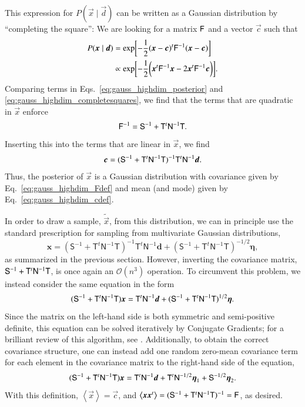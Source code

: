 \documentclass[twocolumn]{aa}
\renewcommand{\d}[0]{\vec{d}}
\newcommand{\x}[0]{\vec{x}}
\newcommand{\F}[0]{\tens{F}}
\newcommand{\T}[0]{\tens{T}}
\newcommand{\N}[0]{\tens{N}}
\renewcommand{\S}[0]{\tens{S}}
\begin{document}
This expression for $P(\x\mid \d)$ can be written as a Gaussian
distribution by ``completing the square'': We are looking for a matrix
$\F$ and a vector $\vec{c}$ such that
\begin{align}
    P(\x\mid \d) &= \exp\biggl[-\frac{1}{2}(\x - \vec{c})^t\F^{-1}(\x - \vec{c})\biggr] \nonumber \\
             &\propto \exp\biggl[-\frac{1}{2}\biggl(\x^t\F^{-1}\x - 2\x^t\F^{-1}\vec{c}\biggr)\biggr].
    \label{eq:gauss_highdim_completesquares}
\end{align}
Comparing terms in Eqs.~\eqref{eq:gauss_highdim_posterior} and \eqref{eq:gauss_highdim_completesquares}, we find that the terms that are quadratic in $\x$ enforce
\begin{equation}
    \F^{-1} = \S^{-1} + \T^t\N^{-1}\T.
    \label{eq:gauss_highdim_Fdef}
\end{equation}
Inserting this into the terms that are linear in $\x$, we find
\begin{equation}
                       \vec{c} = (\S^{-1}+ \T^t\N^{-1}\T)^{-1}\T^t\N^{-1}\d.
    \label{eq:gauss_highdim_cdef}
\end{equation}
Thus, the posterior of $\x$ is a Gaussian distribution with covariance
given by Eq.~\eqref{eq:gauss_highdim_Fdef} and mean (and mode) given by
Eq.~\eqref{eq:gauss_highdim_cdef}.

In order to draw a sample, $\tilde{\x}$, from this distribution, we
can in principle use the standard prescription for sampling from
multivariate Gaussian distributions, 
\begin{equation}
	\boldsymbol x=(\mathsf S^{-1}+\mathsf T^t\mathsf N^{-1}\mathsf T)^{-1}
	\mathsf T^t\mathsf N^{-1}\boldsymbol d+(\mathsf S^{-1}+\mathsf T^t\mathsf N^{-1}\mathsf T)^{-1/2}\boldsymbol\eta,
\end{equation}
as summarized in the previous
section. However, inverting the covariance matrix, $\S^{-1}+
\T^t\N^{-1}\T$, is once again an $\mathcal{O}(n^3)$ operation. To
circumvent this problem, we instead consider the same equation in the
form
\begin{equation}
  (\S^{-1} + \T^t\N^{-1}\T)\x = \T^t\N^{-1}\d
	+(\mathsf S^{-1}+\mathsf T^t\mathsf N^{-1}\mathsf T)^{1/2}\boldsymbol\eta.
  \label{eq:gauss_highdim_cdef_linsys}
\end{equation}
Since the matrix on the left-hand side is both symmetric and
semi-positive definite, this equation can be solved iteratively by
Conjugate Gradients; for a brilliant review of this algorithm, see
\citet{shewchuk:1994}. Additionally, to obtain the correct covariance
structure, one can instead add one random zero-mean covariance term for
each element in the covariance matrix to the right-hand side of the
equation,
\begin{equation}
    (\S^{-1} + \T^t\N^{-1}\T)\x = \T^t\N^{-1}\d + \T^t\N^{-1/2}\vec{\eta}_1 +
    \S^{-1/2}\vec{\eta}_2. 
    \label{eq:multigauss}
\end{equation}
With this definition, $\left<\x\right> = \vec{c}$,
and $\left<\x\x^t\right> = (\S^{-1} + \T^t\N^{-1}\T)^{-1} = \F$, as desired.
\end{document}
